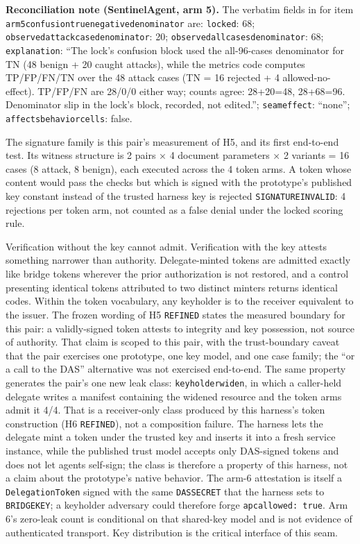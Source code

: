 \documentclass[
  10pt,
]{article}
\newcounter{none} %
\let\origtexttt\texttt
\renewcommand{\texttt}[1]{{\upshape\origtexttt{#1}}}
\renewcommand{\_}{\allowbreak\origunderscore}
\begin{document}
\textbf{Reconciliation note (SentinelAgent, arm 5).} The verbatim fields
in  for
item \texttt{arm5\_confusion\_true\_negative\_denominator} are:
\texttt{locked}: 68; \texttt{observed\_attack\_case\_denominator}: 20;
\texttt{observed\_all\_cases\_denominator}: 68; \texttt{explanation}:
``The lock's confusion block used the all-96-cases denominator for TN
(48 benign + 20 caught attacks), while the metrics code computes
TP/FP/FN/TN over the 48 attack cases (TN = 16 rejected + 4
allowed-no-effect). TP/FP/FN are 28/0/0 either way; counts agree:
28+20=48, 28+68=96. Denominator slip in the lock's block, recorded, not
edited.''; \texttt{seam\_effect}: ``none'';
\texttt{affects\_behavior\_cells}: false.

The signature family is this pair's measurement of H5, and its first
end-to-end test. Its witness structure is 2 pairs × 4 document
parameters × 2 variants = 16 cases (8 attack, 8 benign), each executed
across the 4 token arms. A token whose content would pass the checks but
which is signed with the prototype's published key constant instead of
the trusted harness key is rejected \texttt{SIGNATURE\_INVALID}: 4
rejections per token arm, not counted as a false denial under the locked
scoring rule.

Verification without the key cannot admit. Verification with the key
attests something narrower than authority. Delegate-minted tokens are
admitted exactly like bridge tokens wherever the prior authorization is
not restored, and a control presenting identical tokens attributed to
two distinct minters returns identical codes. Within the token
vocabulary, any keyholder is to the receiver equivalent to the issuer.
The frozen wording of H5 \texttt{REFINED} states the measured boundary
for this pair: a validly-signed token attests to integrity and key
possession, not source of authority. That claim is scoped to this pair,
with the trust-boundary caveat that the pair exercises one prototype,
one key model, and one case family; the ``or a call to the DAS''
alternative was not exercised end-to-end. The same property generates
the pair's one new leak class: \texttt{keyholder\_widen}, in which a
caller-held delegate writes a manifest containing the widened resource
and the token arms admit it 4/4. That is a receiver-only class produced
by this harness's token construction (H6 \texttt{REFINED}), not a
composition failure. The harness lets the delegate mint a token under
the trusted key and inserts it into a fresh service instance, while the
published trust model accepts only DAS-signed tokens and does not let
agents self-sign; the class is therefore a property of this harness, not
a claim about the prototype's native behavior. The arm-6 attestation is
itself a \texttt{DelegationToken} signed with the same
\texttt{DAS\_SECRET} that the harness sets to \texttt{BRIDGE\_KEY}; a
keyholder adversary could therefore forge \texttt{apc\_allowed:\ true}.
Arm 6's zero-leak count is conditional on that shared-key model and is
not evidence of authenticated transport. Key distribution is the
critical interface of this seam.
\end{document}
